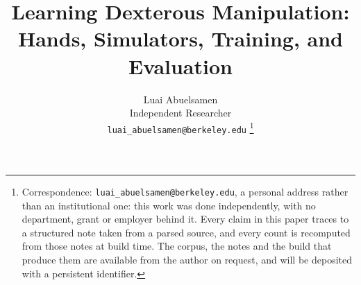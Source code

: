 \documentclass[journal,twoside]{IEEEtran}
\begin{document}
\title{Learning Dexterous Manipulation:\\
Hands, Simulators, Training, and Evaluation}

\author{%
  Luai Abuelsamen\\[2pt]%
  \normalsize Independent Researcher\\[2pt]%
  \normalsize\texttt{luai\_abuelsamen@berkeley.edu}%
  \thanks{Correspondence: \texttt{luai\_abuelsamen@berkeley.edu}, a personal address rather than an
  institutional one: this work was done independently, with no department, grant or employer behind
  it. Every claim in this paper traces to a structured note taken from a parsed source, and every
  count is recomputed from those notes at build time. The corpus, the notes and the build that
  produce them are available from the author on request, and will be deposited with a persistent
  identifier.}%
}

\maketitle

\begin{abstract}

\end{abstract}
\end{document}
